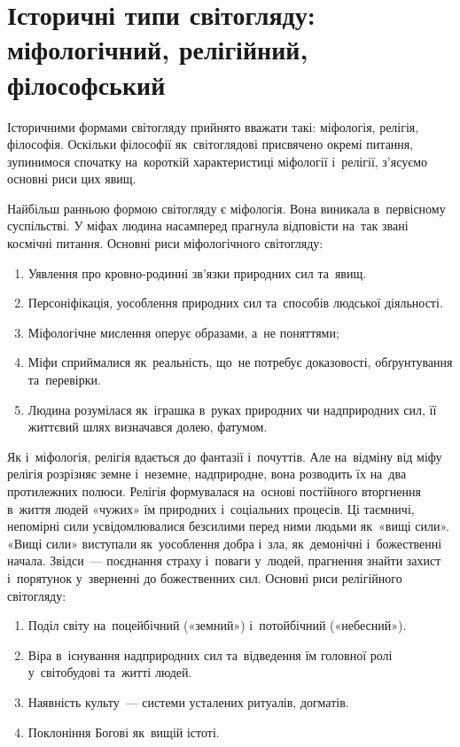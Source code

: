 \documentclass[a5paper,oneside,DIV=12,12pt,headings=small]{scrartcl}
\begin{document}
	\section{Історичні типи світогляду: міфологічний, релігійний, філософський}
		Історичними формами світогляду прийнято вважати такі: міфологія, релігія, філософія. Оскільки філософії як~світоглядові присвячено окремі питання, зупинимося спочатку на~короткій характеристиці міфології і~релігії, з'ясуємо основні риси цих явищ.
		
		Найбільш ранньою формою світогляду є міфологія. Вона виникала в~первісному суспільстві. У міфах людина насамперед прагнула відповісти на~так звані космічні питання.
		Основні риси міфологічного світогляду:
		\begin{enumerate}
			\item Уявлення про кровно-родинні зв'язки природних сил та~явищ.
			\item Персоніфікація, уособлення природних сил та~способів людської діяльності.
			\item Міфологічне мислення оперує образами, а~не поняттями;
			\item Міфи сприймалися як~реальність, що~не потребує доказовості, обґрунтування та~перевірки.
			\item Людина розумілася як~іграшка в~руках природних чи надприродних сил, її життєвий шлях визначався долею, фатумом.
		\end{enumerate}
		
		Як і~міфологія, релігія вдається до фантазії і~почуттів. Але на~відміну від міфу релігія розрізняє земне і~неземне, надприродне, вона розводить їх на~два протилежних полюси. Релігія формувалася на~основі постійного вторгнення в~життя людей «чужих» їм природних і~соціальних процесів. Ці таємничі, непомірні сили усвідомлювалися безсилими перед ними людьми як~«вищі сили». «Вищі сили» виступали як~уособлення добра і~зла, як~демонічні і~божественні начала. Звідси~— поєднання страху і~поваги у~людей, прагнення знайти захист і~порятунок у~зверненні до божественних сил.
		Основні риси релігійного світогляду:
		\begin{enumerate}
			\item Поділ світу на~поцейбічний («земний») і~потойбічний («небесний»).
			\item Віра в~існування надприродних сил та~відведення їм головної ролі у~світобудові та~житті людей.
			\item Наявність культу~— системи усталених ритуалів, догматів.
			\item Поклоніння Богові як~вищій істоті.
		\end{enumerate}
		
\end{document}
